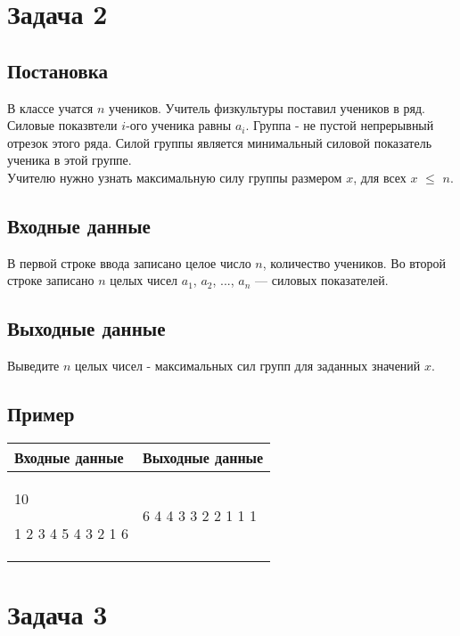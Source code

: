 \documentclass[a4]{article}
\begin{document}
\pagebreak
\section*{Задача 2}
\label{sec:orgef181bd}
\subsection*{Постановка}
\label{sec:orgad8a20e}

В классе учатся \(n\) учеников. Учитель физкультуры поставил учеников в ряд. Силовые показвтели \(i\)-ого ученика равны \(a_i\).
\label{sec:orgb72ba50}
Группа - не пустой непрерывный отрезок этого ряда. Силой группы является минимальный силовой показатель ученика в этой группе. \\
Учителю нужно узнать максимальную силу группы размером \(x\), для всех \(x\) $\leq$ \(n\).
\subsection*{Входные данные}
\label{sec:orgc51833b}
В первой строке ввода записано целое число \(n\), количество учеников.
\label{sec:orgc51833b}
Во второй строке записано \(n\) целых чисел \(a_1\), \(a_2\), ..., \(a_n\) — силовых показателей.
\subsection*{Выходные данные}
\label{sec:orgf9da829}

Выведите \(n\) целых чисел - максимальных сил групп для заданных значений \(x\).

\subsection*{Пример}
\label{sec:orgd7d348d}

\begin{table}[H]
\begin{center}
\begin{tabular}{|m{4cm}|m{4cm}|}
\hline
Входные данные & Выходные данные \\ \hline
10

1 2 3 4 5 4 3 2 1 6
&
6 4 4 3 3 2 2 1 1 1
\\ \hline
\end{tabular}
\end{center}
\end{table}

\pagebreak
\section*{Задача 3}
\label{sec:org570b899}
\end{document}
